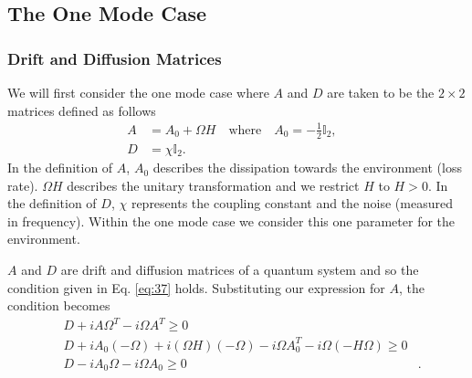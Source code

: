 \documentclass[11pt,a4paper]{article}
\numberwithin{equation}{section}
\begin{document}
	\subsection{The One Mode Case}
	\label{sec:onemode}
	\subsubsection{Drift and Diffusion Matrices}
	\label{sec:onemodedefs}
	We will first consider the one mode case where $A$ and $D$ are taken to be the $2 \times 2$ matrices defined as follows
	\begin{align*}
	A &= A_0 + \Omega H \quad\text{where}\quad A_0 = -\frac{1}{2}\mathbb{I}_2,&\\
	D &= \chi \mathbb{I}_2.&
	\end{align*}
	In the definition of $A$, $A_0$ describes the dissipation towards the environment (loss rate). $\Omega H$ describes the unitary transformation and we restrict $H$ to $H>0$. In the definition of $D$, $\chi$ represents the coupling constant and the noise (measured in frequency). Within the one mode case we consider this one parameter for the environment. 
	
	$A$ and $D$ are drift and diffusion matrices of a quantum system and so the condition given in Eq. \ref{eq:37} holds. Substituting our expression for $A$, the condition becomes
	\begin{align} 
	&D + iA \Omega^T - i\Omega A^T \geq 0& \nonumber\\
	&D + iA_0 (-\Omega) + i (\Omega H) (-\Omega) - i\Omega A_{0}^{T} - i\Omega (-H\Omega) \geq 0& \nonumber\\
	&D - iA_0 \Omega - i\Omega A_0 \geq 0& \label{eq:42}.
	\end{align}
	
\end{document}
